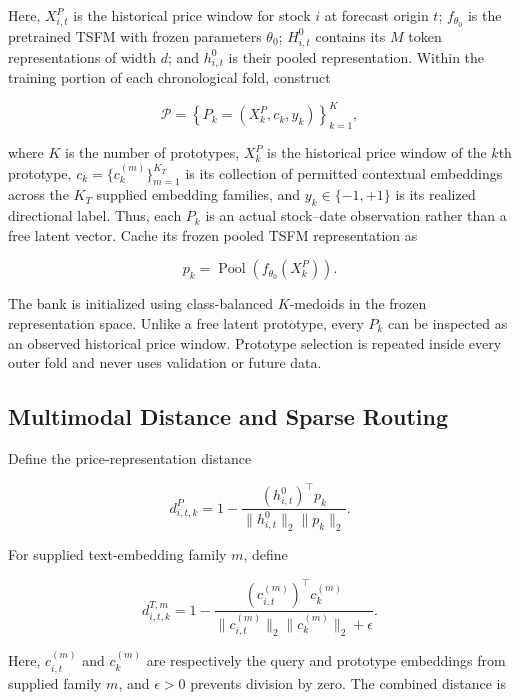 \documentclass[11pt]{article}
\begin{document}
Here, $X^P_{i,t}$ is the historical price window for stock $i$ at forecast
origin $t$; $f_{\theta_0}$ is the pretrained TSFM with frozen parameters
$\theta_0$; $H^0_{i,t}$ contains its $M$ token representations of width $d$;
and $h^0_{i,t}$ is their pooled representation. Within the training portion of
each chronological fold, construct

\begin{equation}
\mathcal P
=
\left\{
P_k=(X_k^P,c_k,y_k)
\right\}_{k=1}^{K},
\end{equation}

where $K$ is the number of prototypes, $X_k^P$ is the historical price window
of the $k$th prototype, $c_k=\{c_k^{(m)}\}_{m=1}^{K_T}$ is its collection of
permitted contextual embeddings across the $K_T$ supplied embedding families,
and $y_k\in\{-1,+1\}$ is its realized directional label. Thus, each $P_k$ is an
actual stock--date observation rather than a free latent vector. Cache its
frozen pooled TSFM representation as

\begin{equation}
p_k
=
\operatorname{Pool}
\left(
f_{\theta_0}(X_k^P)
\right).
\end{equation}

The bank is initialized using class-balanced $K$-medoids in the frozen
representation space. Unlike a free latent prototype, every $P_k$ can be
inspected as an observed historical price window. Prototype selection is
repeated inside every outer fold and never uses validation or future data.

\subsection{Multimodal Distance and Sparse Routing}

Define the price-representation distance

\begin{equation}
d^P_{i,t,k}
=
1-
\frac{
(h^0_{i,t})^\top p_k
}{
\|h^0_{i,t}\|_2\|p_k\|_2
}.
\end{equation}

For supplied text-embedding family $m$, define

\begin{equation}
d^{T,m}_{i,t,k}
=
1-
\frac{
(c^{(m)}_{i,t})^\top c^{(m)}_k
}{
\|c^{(m)}_{i,t}\|_2\|c^{(m)}_k\|_2+\epsilon
}.
\end{equation}

Here, $c^{(m)}_{i,t}$ and $c^{(m)}_k$ are respectively the query and prototype
embeddings from supplied family $m$, and $\epsilon>0$ prevents division by
zero. The combined distance is
\end{document}
